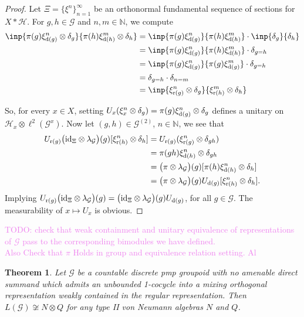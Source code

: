 \documentclass[a4paper,11pt]{article}
\numberwithin{equation}{section}
\newtheorem{thm}{Theorem}[section]
\theoremstyle{definition}
\theoremstyle{remark}
\numberwithin{equation}{section}
\newcommand{\rG}{\mathcal{G}}
\def\N{\mathbb{N}}
\def\H{\mathcal H}
\def\r{{\rm r}}
\def\d{{\rm d}}
\numberwithin{equation}{section}
\begin{document}
\begin{proof}
  Let $ \Xi = \{\xi^{n}\}_{n=1}^{\infty} $ be an orthonormal fundamental sequence of sections for $ X\ast \H $. For $ g,h\in \rG $ and $n, m\in\N $, we compute
  \begin{align*}
    \inp{\pi(g) \xi_{\d(g)}^{n}\otimes \delta_{g}}{\pi(h) \xi_{\d(h)}^{m}\otimes \delta_{h}} &= \inp{\pi(g) \xi_{\d(g)}^{n}}{\pi(h) \xi_{\d(h)}^{m}}\cdot \inp{\delta_{g}}{\delta_{h}}\\
    &= \inp{\pi(g) \xi_{\d(g)}^{n}}{\pi(h) \xi_{\d(h)}^{m}}\cdot \delta_{g=h} \\
    &= \inp{\pi(g) \xi_{\d(g)}^{n}}{\pi(g) \xi_{\d(g)}^{m}}\cdot \delta_{g=h} \\ &=\delta_{g=h}\cdot \delta_{n=m} \\
    &= \inp{\xi_{\r(g)}^{n}\otimes \delta_{g}}{\xi_{\r(h)}^{m}\otimes \delta_{h}}
  \end{align*}

  So, for every $ x\in X $, setting $ U_{x}(\xi_{x}^{n}\otimes \delta_{g}) = \pi(g) \xi_{\d(g)}^{n} \otimes \delta_{g} $ defines a unitary on $ \H_{x}\otimes \ell^{2}(\rG^{x}) $. Now let $(g,h)\in \rG^{(2)}$, $n\in \N$, we see that 
\begin{align*}
    U_{\r(g)}\big({\rm id}_\Xi\otimes \lambda_\rG\big)(g)[\xi_{\r(h)}^n\otimes\delta_h]&=U_{\r(g)}(\xi_{\r(g)}^n\otimes\delta_{gh}) \\
    &=\pi(gh)\xi_{\d(h)}^n\otimes\delta_{gh} \\
    &=\big(\pi\otimes \lambda_\rG\big)(g)[\pi(h)\xi_{\d(h)}^n\otimes\delta_h] \\
    &=\big(\pi\otimes \lambda_\rG\big)(g)U_{\d(g)}[\xi_{\r(h)}^n\otimes\delta_h].
\end{align*} Implying $U_{\r(g)}\big({\rm id}_\Xi\otimes \lambda_\rG\big)(g)=\big({\rm id}_\Xi\otimes \lambda_\rG\big)(g)U_{\d(g)}$, for all $g\in\rG$. The measurability of $x\mapsto U_x$ is obvious. \end{proof}

\textcolor{violet}{TODO: check that weak containment and unitary equivalence of representations of $\rG$ pass to the corresponding bimodules we have defined.\\
Also Check that $\pi$ Holds in group and equivalence relation setting. Al}



\begin{thm}\label{prime}
    Let $\rG$ be a countable discrete pmp groupoid with no amenable direct summand which admits an unbounded 1-cocycle into a mixing orthogonal representation weakly contained in the regular representation. Then $L(\rG) \not \cong N\otimes Q$ for any type II von Neumann algebras $N$ and $Q$. 
\end{thm}
\end{document}
